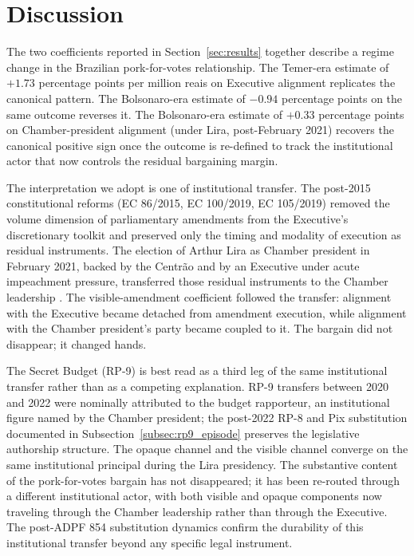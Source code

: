 \documentclass[preprint,12pt,authoryear]{elsarticle}
\begin{document}
\section{Discussion}
\label{sec:discussion}

The two coefficients reported in Section~\ref{sec:results} together describe a regime change in the Brazilian pork-for-votes relationship. The Temer-era estimate of $+1.73$ percentage points per million reais on Executive alignment replicates the canonical \citet{PereiraAndMueller2004} pattern. The Bolsonaro-era estimate of $-0.94$ percentage points on the same outcome reverses it. The Bolsonaro-era estimate of $+0.33$ percentage points on Chamber-president alignment (under Lira, post-February 2021) recovers the canonical positive sign once the outcome is re-defined to track the institutional actor that now controls the residual bargaining margin.

The interpretation we adopt is one of institutional transfer. The post-2015 constitutional reforms (EC 86/2015, EC 100/2019, EC 105/2019) removed the volume dimension of parliamentary amendments from the Executive's discretionary toolkit and preserved only the timing and modality of execution as residual instruments. The election of Arthur Lira as Chamber president in February 2021, backed by the Centr\~ao and by an Executive under acute impeachment pressure, transferred those residual instruments to the Chamber leadership \citep{GrazianeEtAl2022RP9,BrazilReports2022SecretBudget,TCU2022RelatorioContas}. The visible-amendment coefficient followed the transfer: alignment with the Executive became detached from amendment execution, while alignment with the Chamber president's party became coupled to it. The bargain did not disappear; it changed hands.

The Secret Budget (RP-9) is best read as a third leg of the same institutional transfer rather than as a competing explanation. RP-9 transfers between 2020 and 2022 were nominally attributed to the budget rapporteur, an institutional figure named by the Chamber president; the post-2022 RP-8 and Pix substitution documented in Subsection~\ref{subsec:rp9_episode} preserves the legislative authorship structure. The opaque channel and the visible channel converge on the same institutional principal during the Lira presidency. The substantive content of the pork-for-votes bargain has not disappeared; it has been re-routed through a different institutional actor, with both visible and opaque components now traveling through the Chamber leadership rather than through the Executive. The post-ADPF 854 substitution dynamics confirm the durability of this institutional transfer beyond any specific legal instrument.
\end{document}
